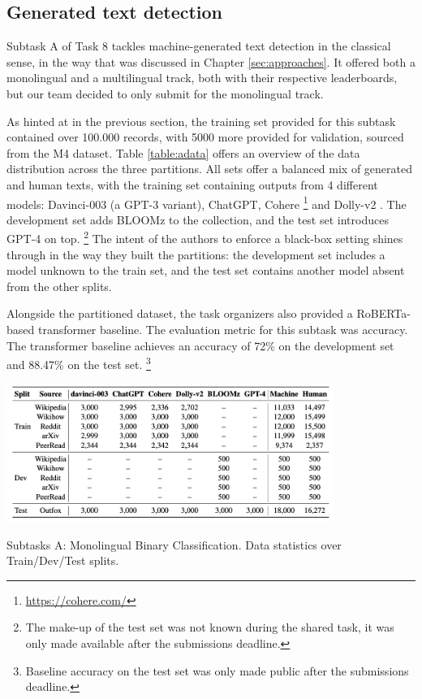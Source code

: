 \subsection{Generated text detection}
\label{subsec:subtask_a}

Subtask A of Task 8 tackles machine-generated text detection in the classical sense, in the way that was discussed in Chapter \ref{sec:approaches}.
It offered both a monolingual and a multilingual track, both with their respective leaderboards, but our team decided to only submit for the monolingual track.

As hinted at in the previous section, the training set provided for this subtask contained over 100.000 records, with 5000 more provided for validation, sourced from the M4 \citep{wang-etal-2024-m4} dataset.
Table \ref{table:adata} offers an overview of the data distribution across the three partitions.
All sets offer a balanced mix of generated and human texts, with the training set containing outputs from 4 different models: Davinci-003 (a GPT-3 variant), ChatGPT, Cohere \footnote{\url{https://cohere.com/}} and Dolly-v2 \citep{DatabricksBlog2023DollyV2}. The development set adds BLOOMz \citep{muennighoff2023crosslingualgeneralizationmultitaskfinetuning} to the collection, and the test set introduces GPT-4 on top.
\footnote{The make-up of the test set was not known during the shared task, it was only made available after the submissions deadline.}
The intent of the authors to enforce a black-box setting shines through in the way they built the partitions: the development set includes a model unknown to the train set, and the test set contains another model absent from the other splits.

Alongside the partitioned dataset, the task organizers also provided a RoBERTa-based transformer baseline.
The evaluation metric for this subtask was accuracy.
The transformer baseline achieves an accuracy of 72\% on the development set and 88.47\% on the test set.
\footnote{Baseline accuracy on the test set was only made public after the submissions deadline.}

\begin{table}[ht]
    \centering
    \includegraphics[width=0.8\textwidth]{assets/subtaska-data.png}
    \caption{Subtasks A: Monolingual Binary Classification. Data statistics over Train/Dev/Test splits.}
    \label{table:adata}
\end{table}

